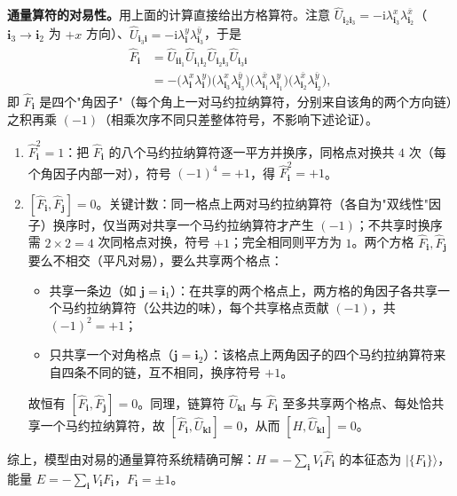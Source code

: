 \textbf{通量算符的对易性。}用上面的计算直接给出方格算符。注意 $\hat U_{\pmb i_2\pmb i_3}=-\mathrm{i}\lambda_{\pmb i_3}^{x}\lambda_{\pmb i_2}^{\bar x}$（$\pmb i_3\to\pmb i_2$ 为 $+x$ 方向）、$\hat U_{\pmb i_3\pmb i}=-\mathrm{i}\lambda_{\pmb i}^{y}\lambda_{\pmb i_3}^{\bar y}$，于是
\begin{align*}
\hat F_{\pmb i}&=\hat U_{\pmb i\pmb i_1}\hat U_{\pmb i_1\pmb i_2}\hat U_{\pmb i_2\pmb i_3}\hat U_{\pmb i_3\pmb i}\\
&=-\big(\lambda_{\pmb i}^{x}\lambda_{\pmb i}^{y}\big)\big(\lambda_{\pmb i_3}^{x}\lambda_{\pmb i_3}^{\bar y}\big)\big(\lambda_{\pmb i_1}^{\bar x}\lambda_{\pmb i_1}^{y}\big)\big(\lambda_{\pmb i_2}^{\bar x}\lambda_{\pmb i_2}^{\bar y}\big),
\end{align*}
即 $\hat F_{\pmb i}$ 是四个"角因子"（每个角上一对马约拉纳算符，分别来自该角的两个方向链）之积再乘 $(-1)$（相乘次序不同只差整体符号，不影响下述论证）。
\begin{enumerate}
\item[(iii)] $\hat F_{\pmb i}^2=1$：把 $\hat F_{\pmb i}$ 的八个马约拉纳算符逐一平方并换序，同格点对换共 $4$ 次（每个角因子内部一对），符号 $(-1)^4=+1$，得 $\hat F_{\pmb i}^2=+1$。
\item[(iv)] $[\hat F_{\pmb i},\hat F_{\pmb j}]=0$。关键计数：同一格点上两对马约拉纳算符（各自为"双线性"因子）换序时，仅当两对共享一个马约拉纳算符才产生 $(-1)$；不共享时换序需 $2\times2=4$ 次同格点对换，符号 $+1$；完全相同则平方为 $1$。两个方格 $\hat F_{\pmb i},\hat F_{\pmb j}$ 要么不相交（平凡对易），要么共享两个格点：
\begin{itemize}
\item 共享一条边（如 $\pmb j=\pmb i_1$）：在共享的两个格点上，两方格的角因子各共享一个马约拉纳算符（公共边的味），每个共享格点贡献 $(-1)$，共 $(-1)^2=+1$；
\item 只共享一个对角格点（$\pmb j=\pmb i_2$）：该格点上两角因子的四个马约拉纳算符来自四条不同的链，互不相同，换序符号 $+1$。
\end{itemize}
故恒有 $[\hat F_{\pmb i},\hat F_{\pmb j}]=0$。同理，链算符 $\hat U_{\pmb{k}\pmb l}$ 与 $\hat F_{\pmb i}$ 至多共享两个格点、每处恰共享一个马约拉纳算符，故 $[\hat F_{\pmb i},\hat U_{\pmb{k}\pmb l}]=0$，从而 $[H,\hat U_{\pmb{k}\pmb l}]=0$。
\end{enumerate}
综上，模型由对易的通量算符系统精确可解：$H=-\sum_{\pmb i}V_{\pmb i}\hat F_{\pmb i}$ 的本征态为 $|\{F_{\pmb i}\}\rangle$，能量 $E=-\sum_{\pmb i}V_{\pmb i}F_{\pmb i}$，$F_{\pmb i}=\pm1$。

